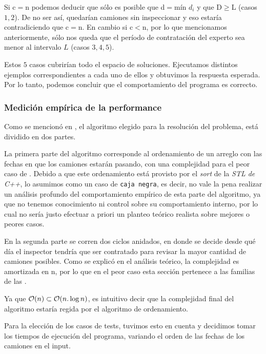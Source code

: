 \documentclass[11pt, a4paper, twoside]{article}
\begin{document}
Si c$=$n podemos deducir que sólo es posible que d$=$mín $d_i$ y que D$\ge$L
(casos $1,2$). De no ser así, quedarían camiones sin inspeccionar y eso estaría
contradiciendo que c$=$n. En cambio si c$<$n, por lo que mencionamos
anteriormente, sólo nos queda que el período de contratación del experto sea
menor al intervalo $L$ (casos $3,4,5$).


Estos $5$ casos cubrirían todo el espacio de soluciones. Ejecutamos distintos
ejemplos correspondientes a cada uno de ellos y obtuvimos la respuesta esperada.
Por lo tanto, podemos concluir que el comportamiento del programa es correcto.

\subsubsection{Medición empírica de la performance}

Como se mencionó en , el algoritmo elegido para la
resolución del problema, está dividido en dos partes. 

La primera parte del algoritmo corresponde al ordenamiento de un arreglo con las
fechas en que los camiones estarán pasando, con una complejidad para el peor
caso de . Debido a que este ordenamiento está provisto por el
\textit{sort} de la \textit{STL de C++}, lo asumimos como un caso de
\texttt{caja negra}, es decir, no vale la pena realizar un análisis profundo del
comportamiento empírico de esta parte del algoritmo, ya que no tenemos
conocimiento ni control sobre su comportamiento interno, por lo cual no sería
justo efectuar a priori un planteo teórico realista sobre mejores o peores
casos.

En la segunda parte se corren dos ciclos anidados, en donde se decide desde qué
día el inspector tendría que ser contratado para revisar la mayor cantidad de
camiones posibles. Como se explicó en el análisis teórico, la complejidad es
amortizada en n, por lo que en el peor caso esta sección pertenece a las
familias de las .

Ya que $\mathop{}\mathopen{}\mathcal{O}\mathopen{}\left(n\right) \subset \mathop{}\mathopen{}\mathcal{O}\mathopen{}\left(n.\log{n}\right)$, es intuitivo decir que la
complejidad final del algoritmo estaría regida por el algoritmo de ordenamiento.

Para la elección de los casos de tests, tuvimos esto en cuenta y decidimos tomar
los tiempos de ejecución del programa, variando el orden de las fechas de los
camiones en el input.
\end{document}
